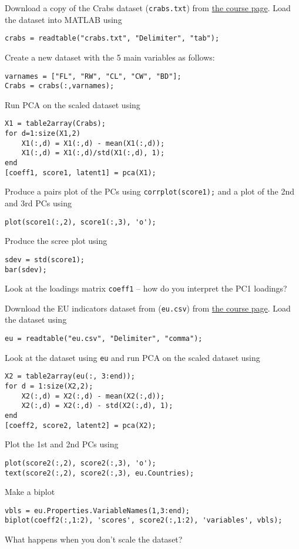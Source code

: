 \documentclass[answers]{exam}
\begin{document}
\begin{questions}
\question%
Download a copy of the Crabs dataset (\texttt{crabs.txt}) from \href{https://courses.maths.ox.ac.uk/course/view.php?id=620}{the course page}. Load the dataset into MATLAB using \begin{verbatim}
crabs = readtable("crabs.txt", "Delimiter", "tab");
\end{verbatim} Create a new dataset with the 5 main variables as follows: \begin{verbatim}
varnames = ["FL", "RW", "CL", "CW", "BD"];
Crabs = crabs(:,varnames);
\end{verbatim} Run PCA on the scaled dataset using \begin{verbatim}
X1 = table2array(Crabs);
for d=1:size(X1,2)
    X1(:,d) = X1(:,d) - mean(X1(:,d));
    X1(:,d) = X1(:,d)/std(X1(:,d), 1);
end
[coeff1, score1, latent1] = pca(X1);
\end{verbatim} Produce a pairs plot of the PCs using \verb|corrplot(score1);| and a plot of the 2nd and 3rd PCs using \begin{verbatim}
plot(score1(:,2), score1(:,3), 'o');
\end{verbatim} Produce the scree plot using \begin{verbatim}
sdev = std(score1);
bar(sdev);
\end{verbatim} Look at the loadings matrix \verb|coeff1| -- how do you interpret the PC1 loadings?



\question%
Download the EU indicators dataset from (\texttt{eu.csv}) from  \href{https://courses.maths.ox.ac.uk/course/view.php?id=620}{the course page}. Load the dataset using \begin{verbatim}
eu = readtable("eu.csv", "Delimiter", "comma");
\end{verbatim} Look at the dataset using \verb|eu| and run PCA on the scaled dataset using \begin{verbatim}
X2 = table2array(eu(:, 3:end));
for d = 1:size(X2,2);
    X2(:,d) = X2(:,d) - mean(X2(:,d));
    X2(:,d) = X2(:,d) - std(X2(:,d), 1);
end
[coeff2, score2, latent2] = pca(X2);
\end{verbatim} Plot the 1st and 2nd PCs using \begin{verbatim}
plot(score2(:,2), score2(:,3), 'o');
text(score2(:,2), score2(:,3), eu.Countries);
\end{verbatim} Make a biplot \begin{verbatim}
vbls = eu.Properties.VariableNames(1,3:end);
biplot(coeff2(:,1:2), 'scores', score2(:,1:2), 'variables', vbls);
\end{verbatim} What happens when you don't scale the dataset?

\end{questions}
\end{document}
